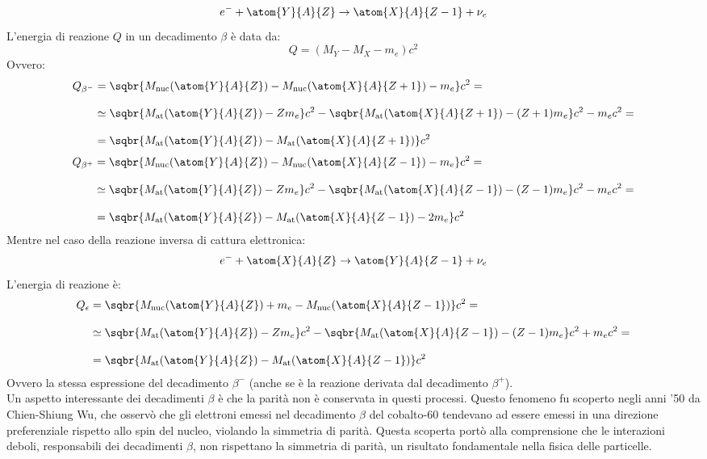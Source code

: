 \begin{equation}
    e^- + \atom{Y}{A}{Z} \to \atom{X}{A}{Z-1} + \nu_{e}
\end{equation}
L'energia di reazione $Q$ in un decadimento $\beta$ è data da:
\begin{equation}
    Q = (M_Y - M_X - m_e)c^2
\end{equation}
Ovvero:
\begin{equation}
    \begin{split}
        Q_{\beta^-} &= \sqbr{M_{\text{nuc}}(\atom{Y}{A}{Z}) - M_{\text{nuc}}(\atom{X}{A}{Z+1}) - m_e}c^2 =\\[8pt]
        &\simeq  \sqbr{M_{\text{at}}(\atom{Y}{A}{Z}) - Zm_e}c^2 - \sqbr{M_{\text{at}}(\atom{X}{A}{Z+1}) - (Z+1)m_e}c^2 - m_e c^2 =\\[8pt]
        &= \sqbr{M_{\text{at}}(\atom{Y}{A}{Z}) - M_{\text{at}}(\atom{X}{A}{Z+1})}c^2
    \end{split}
\end{equation}
\begin{equation}
    \begin{split}
        Q_{\beta^+} &= \sqbr{M_{\text{nuc}}(\atom{Y}{A}{Z}) - M_{\text{nuc}}(\atom{X}{A}{Z-1}) - m_e}c^2 =\\[8pt]
        &\simeq  \sqbr{M_{\text{at}}(\atom{Y}{A}{Z}) - Zm_e}c^2 - \sqbr{M_{\text{at}}(\atom{X}{A}{Z-1}) - (Z-1)m_e}c^2 - m_e c^2 =\\[8pt]
        &= \sqbr{M_{\text{at}}(\atom{Y}{A}{Z}) - M_{\text{at}}(\atom{X}{A}{Z-1}) - 2m_e}c^2
    \end{split}
\end{equation}
Mentre nel caso della reazione inversa di cattura elettronica:
\begin{equation}
    e^- + \atom{X}{A}{Z} \to \atom{Y}{A}{Z-1} + \nu_{e}
\end{equation}
L'energia di reazione è:
\begin{equation}
    \begin{split}
        Q_{\epsilon} &= \sqbr{M_{\text{nuc}}(\atom{Y}{A}{Z}) + m_e - M_{\text{nuc}}(\atom{X}{A}{Z-1}) }c^2 =\\[8pt]
        &\simeq  \sqbr{M_{\text{at}}(\atom{Y}{A}{Z}) - Zm_e}c^2 - \sqbr{M_{\text{at}}(\atom{X}{A}{Z-1}) - (Z-1)m_e}c^2 + m_e c^2 =\\[8pt]
        &= \sqbr{M_{\text{at}}(\atom{Y}{A}{Z}) - M_{\text{at}}(\atom{X}{A}{Z-1})}c^2
    \end{split}
\end{equation}
Ovvero la stessa espressione del decadimento $\beta^-$ (anche se è la reazione derivata dal decadimento $\beta^+$).\\
Un aspetto interessante dei decadimenti $\beta$ è che la parità non è conservata in questi processi. Questo fenomeno fu scoperto negli anni '50 da Chien-Shiung Wu, che osservò che gli elettroni emessi nel decadimento $\beta$ del cobalto-60 tendevano ad essere emessi in una direzione preferenziale rispetto allo spin del nucleo, violando la simmetria di parità. Questa scoperta portò alla comprensione che le interazioni deboli, responsabili dei decadimenti $\beta$, non rispettano la simmetria di parità, un risultato fondamentale nella fisica delle particelle.

